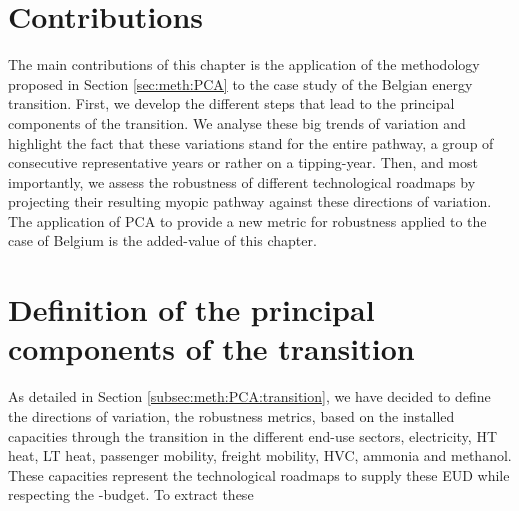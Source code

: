 \section*{Contributions}
\label{sec:RobPol:contributions}
The main contributions of this chapter is the application of the methodology proposed in Section \ref{sec:meth:PCA} to the case study of the Belgian energy transition. First, we develop the different steps that lead to the principal components of the transition. We analyse these big trends of variation and highlight the fact that these variations stand for the entire pathway, a group of consecutive representative years or rather on a tipping-year. Then, and most importantly, we assess the robustness of different technological roadmaps by projecting their resulting myopic pathway against these directions of variation. The application of \gls{PCA} to provide a new metric for robustness applied to the case of Belgium is the added-value of this chapter.

\section{Definition of the principal components of the transition}
\label{sec:RobPol:PC_transition}
As detailed in Section \ref{subsec:meth:PCA:transition}, we have decided to define the directions of variation, \ie the robustness metrics, based on the installed capacities through the transition in the different end-use sectors, \ie electricity, \gls{HT} heat, \gls{LT} heat, passenger mobility, freight mobility, \gls{HVC}, ammonia and methanol. These capacities represent the technological roadmaps to supply these \gls{EUD} while respecting the -budget. To extract these 